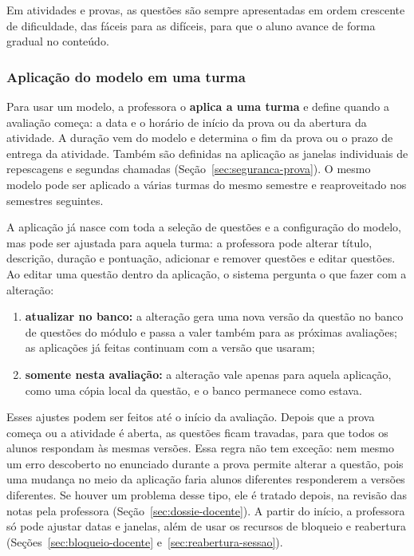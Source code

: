 Em atividades e provas, as questões são sempre apresentadas em ordem crescente de dificuldade, das fáceis para as difíceis, para que o aluno avance de forma gradual no conteúdo.

\subsubsection*{Aplicação do modelo em uma turma}

Para usar um modelo, a professora o \textbf{aplica a uma turma} e define quando a avaliação começa: a data e o horário de início da prova ou da abertura da atividade. A duração vem do modelo e determina o fim da prova ou o prazo de entrega da atividade. Também são definidas na aplicação as janelas individuais de repescagens e segundas chamadas (Seção~\ref{sec:seguranca-prova}). O mesmo modelo pode ser aplicado a várias turmas do mesmo semestre e reaproveitado nos semestres seguintes.

A aplicação já nasce com toda a seleção de questões e a configuração do modelo, mas pode ser ajustada para aquela turma: a professora pode alterar título, descrição, duração e pontuação, adicionar e remover questões e editar questões. Ao editar uma questão dentro da aplicação, o sistema pergunta o que fazer com a alteração:

\begin{enumerate}
    \item \textbf{atualizar no banco:} a alteração gera uma nova versão da questão no banco de questões do módulo e passa a valer também para as próximas avaliações; as aplicações já feitas continuam com a versão que usaram;
    \item \textbf{somente nesta avaliação:} a alteração vale apenas para aquela aplicação, como uma cópia local da questão, e o banco permanece como estava.
\end{enumerate}

Esses ajustes podem ser feitos até o início da avaliação. Depois que a prova começa ou a atividade é aberta, as questões ficam travadas, para que todos os alunos respondam às mesmas versões. Essa regra não tem exceção: nem mesmo um erro descoberto no enunciado durante a prova permite alterar a questão, pois uma mudança no meio da aplicação faria alunos diferentes responderem a versões diferentes. Se houver um problema desse tipo, ele é tratado depois, na revisão das notas pela professora (Seção~\ref{sec:dossie-docente}). A partir do início, a professora só pode ajustar datas e janelas, além de usar os recursos de bloqueio e reabertura (Seções~\ref{sec:bloqueio-docente} e~\ref{sec:reabertura-sessao}).

